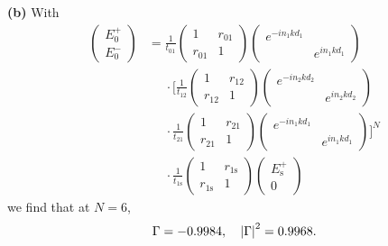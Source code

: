 \documentclass{article}
\makeatletter
\newcommand*{\shifttext}[1]{%
  \settowidth{\@tempdima}{#1}%
  \hspace{-\@tempdima}#1%
}
\newcommand{\plabel}[1]{%
\shifttext{\textbf{#1}\quad}%
}
\makeatother
\begin{document}
\plabel{(b)}%
With
\begin{align*}
    \begin{pmatrix}
        E_0^+ \\ E_0^-
    \end{pmatrix} &= \frac{1}{t_{01}} \begin{pmatrix}
        1 & r_{01} \\
        r_{01} & 1
    \end{pmatrix} \begin{pmatrix}
        e^{-in_1kd_1} & \\
        & e^{in_1kd_1}
    \end{pmatrix} \\
    &\phantom{{}={}} \cdot \bigg[ \frac{1}{t_{12}} \begin{pmatrix}
        1 & r_{12} \\
        r_{12} & 1
    \end{pmatrix} \begin{pmatrix}
        e^{-in_2kd_2} & \\
        & e^{in_2kd_2}
    \end{pmatrix} \\
    &\phantom{{}={}} \cdot \frac{1}{t_{21}} \begin{pmatrix}
        1 & r_{21} \\
        r_{21} & 1
    \end{pmatrix} \begin{pmatrix}
        e^{-in_1kd_1} & \\
        & e^{in_1kd_1}
    \end{pmatrix}\bigg]^N \\
    &\phantom{{}={}} \cdot \frac{1}{t_{1\mathrm{s}}} \begin{pmatrix}
        1 & r_{1\mathrm{s}} \\
        r_{1\mathrm{s}} & 1
    \end{pmatrix} \begin{pmatrix}
        E_{\mathrm{s}}^+ \\
        0
    \end{pmatrix}
\end{align*}
we find that at $N=6$,
\[ \Gamma = \num{-0.9984},\quad \abs{\Gamma}^2 = \num{0.9968}. \]
\end{document}
